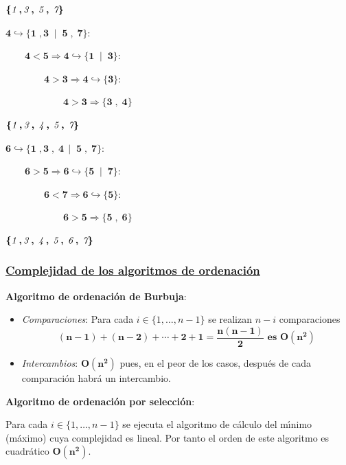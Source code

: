 \documentclass[twoside]{report}
\newcommand{\bs}[1]{\boldsymbol{#1}}
\begin{document}
        $\bs{\{\emph{1}\;,\emph{3}\;,\;\emph{5}\;,\;\emph{7}\}}$
        \medskip

        $\bs{4\hookrightarrow\{1\;,3\;\mid\;5\;,\;7\}:}$\par
            $\bs{\qquad4<5\Rightarrow4\hookrightarrow\{1\;\mid\;3\}:}$\par
                $\bs{\qquad\qquad4>3\Rightarrow4\hookrightarrow\{3\}:}$\par
                    $\bs{\qquad\qquad\qquad4>3\Rightarrow\{3\;,\;4\}}$
        \medskip

        $\bs{\{\emph{1}\;,\emph{3}\;,\;\emph{4}\;,\;\emph{5}\;,\;\emph{7}\}}$
        \medskip

        $\bs{6\hookrightarrow\{1\;,3\;,\;4\,\mid\;5\;,\;7\}:}$\par
            $\bs{\qquad6>5\Rightarrow6\hookrightarrow\{5\;\mid\;7\}:}$\par
                $\bs{\qquad\qquad6<7\Rightarrow6\hookrightarrow\{5\}:}$\par
                    $\bs{\qquad\qquad\qquad6>5\Rightarrow\{5\;,\;6\}}$
        \medskip

        $\bs{\{\emph{1}\;,\emph{3}\;,\;\emph{4}\;,\;\emph{5}\;,\;\emph{6}\;,\;\emph{7}\}}$




\subsubsection{\underline{Complejidad de los algoritmos de ordenaci\'{o}n}}
\vspace{0.4cm}

\noindent\textbf{Algoritmo de ordenaci\'{o}n de Burbuja}:

 \begin{itemize}
    \item \emph{Comparaciones}: Para cada $i\in \{1,\ldots, n-1\}$ se realizan $n-i$ comparaciones
    $$\bs{(n-1)+(n-2)+\cdots+2+1=\frac{n(n-1)}{2} \mbox{ es } O(n^2)}$$

    \item \emph{Intercambios}: $\bs{O(n^2)}$ pues, en el peor de los casos, despu\'{e}s de cada comparaci\'{o}n habr\'{a} un intercambio.
 \end{itemize}
\vspace{0.4cm}

 \noindent\textbf{Algoritmo de ordenaci\'{o}n por selecci\'{o}n}:

\vspace{0.4cm}
Para cada $i\in \{1,\ldots, n-1\}$ se ejecuta el algoritmo de
c\'{a}lculo del m\'{\i}nimo (m\'{a}ximo) cuya complejidad es lineal. Por tanto
el orden de este algoritmo es cuadr\'{a}tico $\bs{O(n^2)}.$
\vspace{1.5cm}
\end{document}
